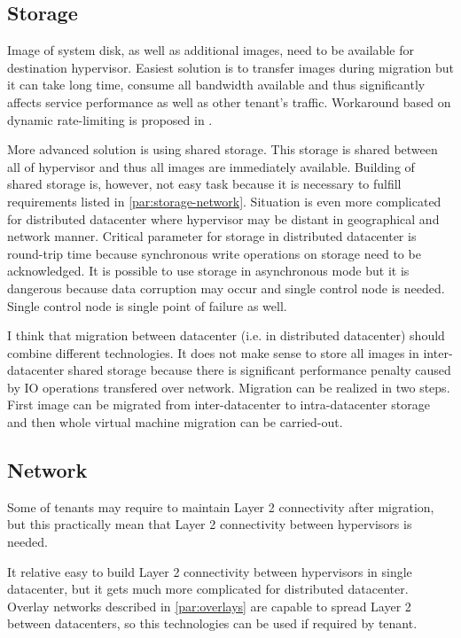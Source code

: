 \subsection{Storage}
Image of system disk, as well as additional images, need to be available for destination hypervisor. Easiest solution is to transfer images during migration but it can take long time, consume all bandwidth available and thus significantly affects service performance as well as other tenant's traffic. Workaround based on dynamic rate-limiting is proposed in \cite{live-migration-of-vms}.

More advanced solution is using shared storage. This storage is shared between all of hypervisor and thus all images are immediately available. Building of shared storage is, however, not easy task because it is necessary to fulfill requirements listed in \ref{par:storage-network}. Situation is even more complicated for distributed datacenter where hypervisor may be distant in geographical and network manner. Critical parameter for storage in distributed datacenter is round-trip time because synchronous write operations on storage need to be acknowledged. It is possible to use storage in asynchronous mode but it is dangerous because data corruption may occur and single control node is needed. Single control node is single point of failure as well. 

I think that migration between datacenter (i.e. in distributed datacenter) should combine different technologies. It does not make sense to store all images in inter-datacenter shared storage because there is significant performance penalty caused by \Ac{IO} operations transfered over network. Migration can be realized in two steps. First image can be migrated from inter-datacenter to intra-datacenter storage and then whole virtual machine migration can be carried-out.

\subsection{Network}
Some of tenants may require to maintain Layer 2 connectivity after migration, but this practically mean that Layer 2 connectivity between hypervisors is needed. 

It relative easy to build Layer 2 connectivity between hypervisors in single datacenter, but it gets much more complicated for distributed datacenter. Overlay networks described in \ref{par:overlays} are capable to spread Layer 2 between datacenters, so this technologies can be used if required by tenant. 

